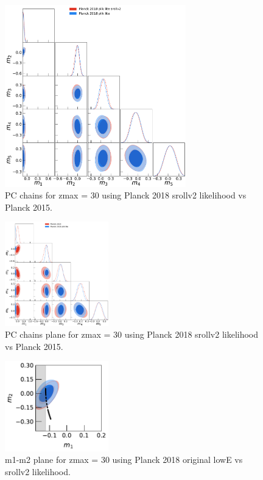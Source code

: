 \documentclass[prd,amsmath,amssymb,floatfix,superscriptaddress,nofootinbib]{revtex4-1}
\begin{document}
\begin{widetext}

\begin{figure}
\includegraphics[width=0.7\textwidth]{results/pc_results/plot_mj_triangle_pl18_pc_zmax30_pliklite_srollv2_vs_pl18_pc_zmax30_pliklite.pdf}
\caption{PC chains for zmax = 30 using Planck 2018 srollv2 likelihood vs Planck 2015.
}
\label{fig:plot_mjs}
\end{figure}

\begin{figure}
\includegraphics[width=0.4\textwidth]{results/pc_results/plot_mj_triangle_t18_r12_t19_t20_vs_pl18_pc_zmax30_pliklite.pdf}
\caption{PC chains plane for zmax = 30 using Planck 2018 srollv2 likelihood vs Planck 2015.
}
\label{fig:plot_mjs_2018_vs_2015}
\end{figure}

\end{widetext}

\begin{figure}
\includegraphics[width=0.4\textwidth]{results/pc_results/plot_m1_m2_pl18_pc_zmax30_pliklite_srollv2_vs_pl18_pc_zmax30_pliklite_wTauTrajectory.pdf}
\caption{m1-m2 plane for zmax = 30 using Planck 2018 original lowE vs srollv2 likelihood.
}
\label{fig:plot_m1m2}
\end{figure}
\end{document}
